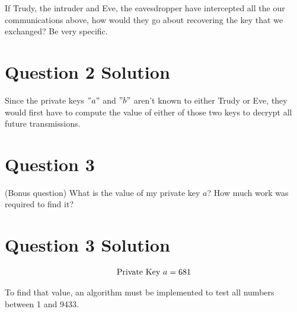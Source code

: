\documentclass[11pt]{article}
\begin{document}
If Trudy, the intruder and Eve, the eavesdropper have intercepted all the our communications above, how would they go about recovering the key that we exchanged? Be very specific.

\section*{Question 2 Solution}

Since the private keys $"a"$ and $"b"$ aren't known to either Trudy or Eve, they would first have to compute the value of either of those two keys to decrypt all future transmissions.

\section*{Question 3}

(Bonus question) What is the value of my private key $a$? How much work was required to find it?

\section*{Question 3 Solution}

\begin{displaymath}
\begin{tabular}{c}
Private Key $a = 681$
\end{tabular}
\end{displaymath}

To find that value, an algorithm must be implemented to test all numbers between 1 and 9433.
\end{document}
